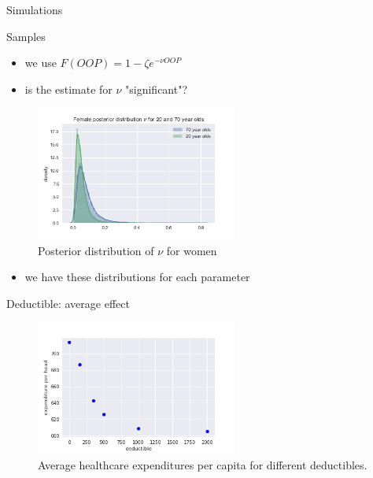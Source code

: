 \documentclass[presentation]{beamer}
\begin{document}
\begin{frame}[label={sec:org529e4a1}]{Simulations}
\begin{block}{Samples}
\begin{itemize}
\item we use \(F(OOP) = 1-\zeta e^{-\nu OOP}\)
\item is the estimate for \(\nu\) "significant"?
\end{itemize}

\begin{figure}[htbp]
\centering
\includegraphics[width=250px]{./Posterior_nu_y_healthy_Female.png}
\caption{\label{fig:nu_women}
Posterior distribution of \(\nu\) for women}
\end{figure}
\begin{itemize}
\item we have these distributions for each parameter
\end{itemize}
\end{block}





\begin{block}{Deductible: average effect}
\begin{figure}[htbp]
\centering
\includegraphics[width=250px]{./Population_weighted_average_exp_simulation_deductibles_healthy_Male.png}
\caption{\label{fig:exp_deduc}
Average healthcare expenditures per capita for different deductibles.}
\end{figure}
\end{block}



\end{frame}
\end{document}

